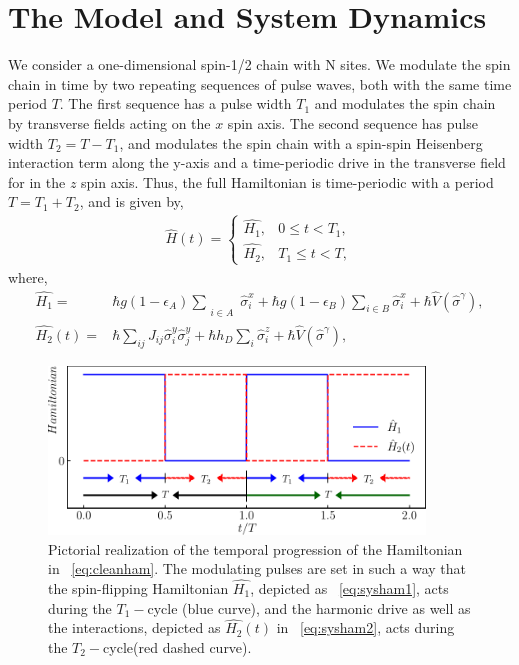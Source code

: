 \documentclass[12pt]{iopart}
\providecommand{\DIFaddtex}[1]{{\protect\color{red}\uwave{#1}}} %
\providecommand{\DIFdeltex}[1]{{}}                      %
\providecommand{\DIFaddFL}[1]{\DIFadd{#1}} %
\providecommand{\DIFdelFL}[1]{\DIFdel{#1}} %
\providecommand{\DIFaddbeginFL}{} %
\providecommand{\DIFaddendFL}{} %
\providecommand{\DIFdelbeginFL}{} %
\providecommand{\DIFdelendFL}{} %
\providecommand{\DIFadd}[1]{\texorpdfstring{\DIFaddtex{#1}}{#1}} %
\providecommand{\DIFdel}[1]{\texorpdfstring{\DIFdeltex{#1}}{}} %
\newcommand{\DIFscaledelfig}{0.5}
\newlength{\DIFdelgraphicswidth} %
\newlength{\DIFdelgraphicsheight} %
\newcommand{\DIFaddincludegraphics}[2][]{{\color{blue}\fbox{\DIFOincludegraphics[#1]{#2}}}} %
\newcommand{\DIFdelincludegraphics}[2][]{%
\sbox{\DIFdelgraphicsbox}{\DIFOincludegraphics[#1]{#2}}%
\settoboxwidth{\DIFdelgraphicswidth}{\DIFdelgraphicsbox} %
\settoboxtotalheight{\DIFdelgraphicsheight}{\DIFdelgraphicsbox} %
\scalebox{\DIFscaledelfig}{%
\parbox[b]{\DIFdelgraphicswidth}{\usebox{\DIFdelgraphicsbox}\\[-\baselineskip] \rule{\DIFdelgraphicswidth}{0em}}\llap{\resizebox{\DIFdelgraphicswidth}{\DIFdelgraphicsheight}{%
\setlength{\unitlength}{\DIFdelgraphicswidth}%
\begin{picture}(1,1)%
\thicklines\linethickness{2pt} %
{\color[rgb]{1,0,0}\put(0,0){\framebox(1,1){}}}%
{\color[rgb]{1,0,0}\put(0,0){\line( 1,1){1}}}%
{\color[rgb]{1,0,0}\put(0,1){\line(1,-1){1}}}%
\end{picture}%
}\hspace*{3pt}}} %
} %
\DeclareRobustCommand{\DIFaddbeginFL}{\DIFOaddbeginFL \let\includegraphics\DIFaddincludegraphics} %
\DeclareRobustCommand{\DIFaddendFL}{\DIFOaddendFL \let\includegraphics\DIFOincludegraphics} %
\DeclareRobustCommand{\DIFdelbeginFL}{\DIFOdelbeginFL \let\includegraphics\DIFdelincludegraphics} %
\DeclareRobustCommand{\DIFdelendFL}{\DIFOaddendFL \let\includegraphics\DIFOincludegraphics} %
\begin{document}
\section{\label{sec:mdl_n_dynam} The Model and System Dynamics}
We consider a one-dimensional spin-1/2 chain with N sites.  We modulate the spin chain in time by two repeating sequences of pulse waves, both with the same time period $T$.  The first sequence has a pulse width $T_1$ and modulates the spin chain by transverse fields acting on the $x$ spin axis. The second sequence has pulse width $T_2=T-T_1$, and modulates the spin chain with a spin-spin Heisenberg interaction term along the y-axis and a time-periodic drive in the transverse field for in the $z$ spin axis. Thus, the full Hamiltonian is time-periodic with a period $T=T_1+T_2$, and is given by,
\begin{align}
    \hat{H}(t) = 
    \begin{cases}
        \hat{H_1} , & 0\leq t < T_1,\\
        \hat{H_2} , & T_1\leq t < T,
    \end{cases}
    \label{eq:cleanham}
\end{align}
where,
\begin{align}
    \hat{H_1} = & \hbar g (1-\epsilon_A) \sum_{\substack{\\i \in A}}\hat{\sigma}^x_i + \hbar g (1-\epsilon_B) \sum_{i \in B}\hat{\sigma}^x_i+ \hbar\hat{V}(\hat{\sigma}^{\gamma}),\label{eq:sysham1}\\
    \hat{H_2}(t) = & \hbar\sum_{ij} J_{ij} \hat{\sigma}^y_i \hat{\sigma}^y_{j} +  \hbar h_D \sum_i \hat{\sigma}^z_i + \hbar\hat{V}(\hat{\sigma}^{\gamma}),
    \label{eq:sysham2}
\end{align}
\begin{figure}
    \begin{center}
        \includegraphics[width=10cm]{figure1.pdf}
    \end{center}
    \caption{Pictorial realization of the temporal progression of the Hamiltonian in \DIFdelbeginFL \DIFdelFL{Eq.}\DIFdelendFL \DIFaddbeginFL \DIFaddFL{equation}\DIFaddendFL ~\eqref{eq:cleanham}. The modulating pulses are set in such a way that the spin-flipping Hamiltonian $\hat{H_1}$, depicted as \DIFdelbeginFL \DIFdelFL{Eq.}\DIFdelendFL \DIFaddbeginFL \DIFaddFL{equation}\DIFaddendFL ~\eqref{eq:sysham1}, acts during the $T_1-$cycle (blue curve), and the harmonic drive as well as the interactions, depicted as $\hat{H_2}(t)$ in \DIFdelbeginFL \DIFdelFL{Eq.}\DIFdelendFL \DIFaddbeginFL \DIFaddFL{equation}\DIFaddendFL ~\eqref{eq:sysham2}, acts during the $T_2-$cycle(red dashed curve).}
    \label{Fig:time_distribution}
\end{figure}	
\end{document}
